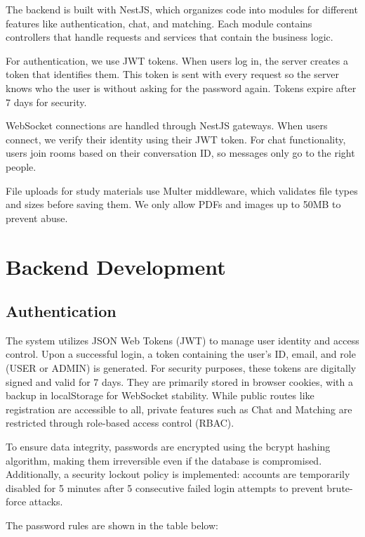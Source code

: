 \documentclass[a4paper,12pt]{report}
\begin{document}
The backend is built with NestJS, which organizes code into modules for different features like authentication, chat, and matching. Each module contains controllers that handle requests and services that contain the business logic.

For authentication, we use JWT tokens. When users log in, the server creates a token that identifies them. This token is sent with every request so the server knows who the user is without asking for the password again. Tokens expire after 7 days for security.

WebSocket connections are handled through NestJS gateways. When users connect, we verify their identity using their JWT token. For chat functionality, users join rooms based on their conversation ID, so messages only go to the right people.

File uploads for study materials use Multer middleware, which validates file types and sizes before saving them. We only allow PDFs and images up to 50MB to prevent abuse.

\section{Backend Development}
\subsection{Authentication}

The system utilizes JSON Web Tokens (JWT) to manage user identity and access control. Upon a successful login, a token containing the user's ID, email, and role (USER or ADMIN) is generated. For security purposes, these tokens are digitally signed and valid for 7 days. They are primarily stored in browser cookies, with a backup in localStorage for WebSocket stability. While public routes like registration are accessible to all, private features such as Chat and Matching are restricted through role-based access control (RBAC).

To ensure data integrity, passwords are encrypted using the bcrypt hashing algorithm, making them irreversible even if the database is compromised. Additionally, a security lockout policy is implemented: accounts are temporarily disabled for 5 minutes after 5 consecutive failed login attempts to prevent brute-force attacks.

The password rules are shown in the table below:
\end{document}

